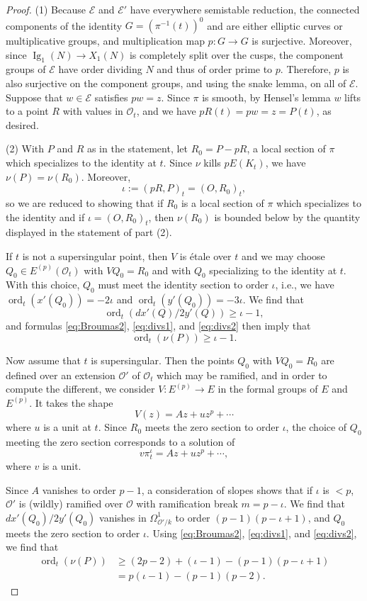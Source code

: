 \documentclass[12pt,reqno]{amsart}
\numberwithin{equation}{section}
\theoremstyle{plain}
\theoremstyle{definition}
\theoremstyle{remark}
\newcommand{\EE}{\mathcal{E}}
\newcommand{\OO}{\mathcal{O}}
\newcommand{\<}{\langle}
\renewcommand{\>}{\rangle}
\DeclareMathOperator{\ord}{ord}
\numberwithin{equation}{section}
\DeclareMathOperator{\Ig}{Ig}
\begin{document}
\begin{proof}
  (1) Because $\EE$ and $\EE'$ have everywhere semistable reduction,
  the connected components of the identity
  $G=\left(\pi^{-1}(t)\right)^0$ and are either elliptic curves or
  multiplicative groups, and multiplication map $p:G\to G$ is
  surjective.  Moreover, since $\Ig_1(N)\to X_1(N)$ is completely
  split over the cusps, the component groups of $\EE$ have order
  dividing $N$ and thus of order prime to $p$.  Therefore, $p$ is also
  surjective on the component groups, and using the snake lemma, on
  all of $\EE$.  Suppose that $w\in \EE$ satisfies $pw=z$.  Since
  $\pi$ is smooth, by Hensel's lemma $w$ lifts to a point $R$ with
  values in $\OO_{t}$, and we have $pR(t)=pw=z=P(t)$, as desired. 

  (2) With $P$ and $R$ as in the statement, let $R_0=P-pR$, a local
  section of $\pi$ which specializes to the identity at $t$.  Since
  $\nu$ kills $pE(K_t)$, we have $\nu(P)=\nu(R_0)$.  Moreover,
  \[\iota:=(pR,P)_t=(O,R_0)_t,\] %
  so we are reduced to showing that if $R_0$ is a local section of
  $\pi$ which specializes to the identity and if $\iota=(O,R_0)_t$,
  then $\nu(R_0)$ is bounded below by the quantity displayed in the
  statement of part (2).

  If $t$ is not a supersingular point, then $V$ is \'etale over $t$
  and we may choose $Q_0\in E^{(p)}(\OO_t)$ with $VQ_0=R_0$ and with
  $Q_0$ specializing to the identity at $t$.  With this choice, $Q_0$
  must meet the identity section to order $\iota$, i.e., we have
  $\ord_t(x'(Q_0))=-2\iota$ and $\ord_t(y'(Q_0))=-3\iota$.  We find
  that
\[\ord_t(dx'(Q)/2y'(Q))\ge \iota-1,\]
and formulas \eqref{eq:Broumas2}, \eqref{eq:divs1}, and
\eqref{eq:divs2} then imply that
\[\ord_t(\nu(P))\ge \iota-1.\]

Now assume that $t$ is supersingular.  Then the points $Q_0$ with
$VQ_0=R_0$ are defined over an extension $\OO'$ of $\OO_t$ which may
be ramified, and in order to compute the different, we consider
$V:E^{(p)}\to E$ in the formal groups of $E$ and $E^{(p)}$.  It takes
the shape
\[ V(z)=Az+uz^p+\cdots\] %
where $u$ is a unit at $t$.  Since $R_0$ meets the zero section to
order $\iota$, the choice of $Q_0$ meeting the zero section
corresponds to a solution of
\[v\pi_t^\iota=Az+uz^p+\cdots,\] %
where $v$ is a unit.

Since $A$ vanishes to order $p-1$, a consideration of slopes shows
that if $\iota$ is $<p$, $\OO'$ is (wildly) ramified over $\OO$ with
ramification break $m=p-\iota$.  We find that $dx'(Q_0)/2y'(Q_0)$
vanishes in $\Omega^1_{\OO'/k}$ to order $(p-1)(p-\iota+1)$, and
$Q_0$ meets the zero section to order $\iota$.  Using
\eqref{eq:Broumas2}, \eqref{eq:divs1}, and \eqref{eq:divs2}, we find
that
\begin{align*}
  \ord_t(\nu(P))&\ge (2p-2)+(\iota-1)-(p-1)(p-\iota+1)\\
  &=p(\iota-1)-(p-1)(p-2).
\end{align*}


\end{proof}
\end{document}
